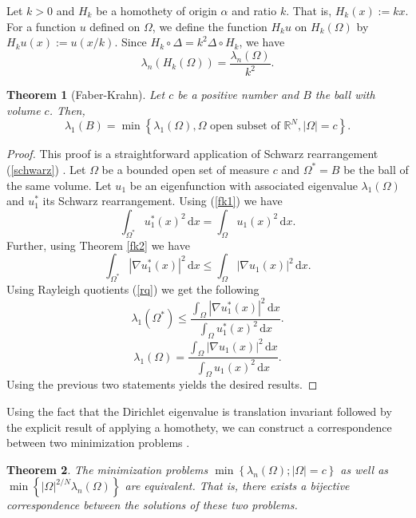 \documentclass[12pt]{report}
\newtheorem{theorem}{Theorem}[section]
\numberwithin{definition}{section}
\begin{document}
Let $k > 0$ and $H_{k}$ be a homothety of origin $\alpha$ and ratio $k$.
That is, $H_{k}(x) := kx$.
For a function $u$ defined on  $\Omega$, we define the function $H_{k}u$ on $H_{k}(\Omega)$ by $H_{k}u(x) := u(x/k)$.
Since $H_{k} \circ \Delta = k^2 \Delta \circ H_{k}$, we have
\[
\lambda_{n}(H_{k}(\Omega)) = \frac{\lambda_{n}(\Omega)}{k^2}
.\] 

\begin{theorem}[Faber-Krahn] \label{fk}
 Let $c$ be a positive number and $B$ the ball with volume $c$. Then,
 \[
   \lambda_{1}(B) = \min \left\{ \lambda_{1}(\Omega), \Omega \text{ open subset of } \mathbb{R}^{N}, |\Omega| = c \right\} 
 .\] 
\end{theorem}

\begin{proof}
  This proof is a straightforward application of Schwarz rearrangement (\ref{schwarz}) \cite{henrot}.
  Let $\Omega$ be a bounded open set of measure $c$ and $\Omega^* = B$ be the ball of the same volume.
  Let $u_1$ be an eigenfunction with associated eigenvalue $\lambda_{1}(\Omega)$ and $u_1^*$ its Schwarz rearrangement.
  Using (\ref{fk1}) we have
  \[
   \int_{\Omega^{*}} \! u_1^{*}(x)^2 \, \mathrm{d}x = \int_{ \Omega} \! u_1(x)^2 \, \mathrm{d}x
  .\] 
  Further, using Theorem \ref{fk2} we have
  \[
     \int_{\Omega^{*}} \! | \nabla u_1^{*}(x) |^2 \, \mathrm{d}x \leq \int_\Omega \! | \nabla u_1(x)  |^2  \, \mathrm{d}x
  .\] 
  Using Rayleigh quotients (\ref{rq}) we get the following
  \[
    \lambda_{1}(\Omega^{*}) \leq \frac{\int_{\Omega} \! | \nabla u_1^{*}(x) |^2 \, \mathrm{d}x }{\int_{\Omega} \! u_1^{*}(x)^2 \, \mathrm{d}x }
  .\] 
  \[
    \lambda_{1}(\Omega) = \frac{\int_{ \Omega} \! | \nabla u_1(x) | ^2 \, \mathrm{d}x }{\int_{ \Omega} \! u_1(x)^2 \, \mathrm{d}x}
  .\] 
  Using the previous two statements yields the desired results.
\end{proof}

Using the fact that the Dirichlet eigenvalue is translation invariant followed by the explicit result of applying a homothety, we can construct a correspondence between two minimization problems \cite{henrot}.

\begin{theorem} \label{eqmin}
The minimization problems $\min \left\{ \lambda_{n}(\Omega); |\Omega| = c \right\} $ as well as $\min \left\{ |\Omega|^{2/N}  \lambda_{n}(\Omega) \right\} $ are equivalent.
That is, there exists a bijective correspondence between the solutions of these two problems.
\end{theorem}
\end{document}
